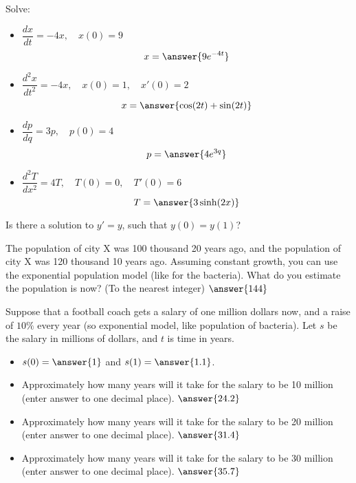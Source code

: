 \documentclass{ximera}
\begin{document}
\begin{exercise}%
    Solve:
    \begin{itemize}
        \item $\dfrac{dx}{dt} = -4x, \quad x(0)=9$
            \[
                x = \answer{9e^{-4t}}
            \]
        \item $\dfrac{d^2x}{dt^2} = -4x, \quad x(0)=1, \quad x'(0)=2$
            \[
                x = \answer{\cos(2t)+\sin(2t)}
            \]
        \item $\dfrac{dp}{dq} = 3 p, \quad p(0)=4$
            \[
                p = \answer{4e^{3q}}
            \]
        \item $\dfrac{d^2T}{dx^2} = 4 T, \quad T(0)=0, \quad T'(0)=6$
            \[
                T = \answer{3\sinh(2x)}
            \]
    \end{itemize}
\end{exercise}

\begin{exercise}
    Is there a solution to $y' = y$, such that $y(0) = y(1)$?
    \begin{multipleChoice}
    \end{multipleChoice}
\end{exercise}

\begin{exercise}
    The population of city X was 100 thousand 20 years ago, and the population of city X was 120 thousand 10 years ago.  Assuming constant growth, you can use the exponential population model (like for the bacteria).  What do you estimate the population is now? (To the nearest integer) $\answer{144}$
\end{exercise}

\begin{exercise}
    Suppose that a football coach gets a salary of one million dollars now, and a raise of $10\%$ every year (so exponential model, like population of bacteria). Let $s$ be the salary in millions of dollars, and $t$ is time in years.
    \begin{itemize}
        \item $s(0) = \answer{1}$ and $s(1) = \answer{1.1}$.
        \item Approximately how many years will it take for the salary to be 10 million (enter answer to one decimal place). $\answer{24.2}$
        \item Approximately how many years will it take for the salary to be 20 million (enter answer to one decimal place). $\answer{31.4}$
        \item Approximately how many years will it take for the salary to be 30 million (enter answer to one decimal place). $\answer{35.7}$
    \end{itemize}
\end{exercise}
\end{document}
